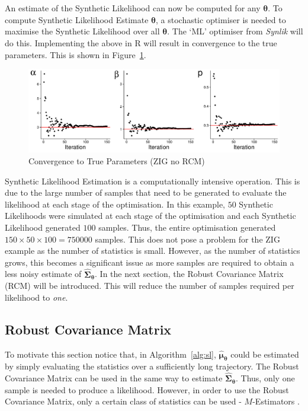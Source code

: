 An estimate of the Synthetic Likelihood can now be computed for any $\pmb{\theta}$. To compute Synthetic Likelihood Estimate $\hat{\pmb{\theta}}$, a stochastic optimiser is needed to maximise the Synthetic Likelihood over all $\pmb{\theta}$. The `ML' optimiser from \emph{Synlik} \citep{synlik_2014} will do this. Implementing the above in R will result in convergence to the true parameters. This is shown in Figure~\ref{fig:no_robust_zig}.

\begin{figure}[H]
    \centering
    \includegraphics[width=12cm]{images/sl/gamma_example/no_robust_optimisation.pdf}
    \caption{Convergence to True Parameters (ZIG no RCM)}
    \label{fig:no_robust_zig}
\end{figure}

Synthetic Likelihood Estimation is a computationally intensive operation. This is due to the large number of samples that need to be generated to evaluate the likelihood at each stage of the optimisation. In this example, $50$ Synthetic Likelihoods were simulated at each stage of the optimisation and each Synthetic Likelihood generated $100$ samples. Thus, the entire optimisation generated $150 \times 50 \times 100 = 750000$ samples. This does not pose a problem for the ZIG example as the number of statistics is small. However, as the number of statistics grows, this becomes a significant issue as more samples are required to obtain a less noisy estimate of $\hat{\pmb{\Sigma}}_{\pmb{\theta}}$. In the next section, the Robust Covariance Matrix (RCM) will be introduced. This will reduce the number of samples required per likelihood to \emph{one}.

\subsection{Robust Covariance Matrix}
\label{subsec:rcm}
To motivate this section notice that, in Algorithm~\ref{alg:sl}, $\hat{\pmb{\mu}}_{\pmb{\theta}}$ could be estimated by simply evaluating the statistics over a sufficiently long trajectory. The Robust Covariance Matrix can be used in the same way to estimate $\hat{\pmb{\Sigma}}_{\pmb{\theta}}$. Thus, only one sample is needed to produce a likelihood. However, in order to use the Robust Covariance Matrix, only a certain class of statistics can be used - $M$-Estimators \citep{huber_1967}.

